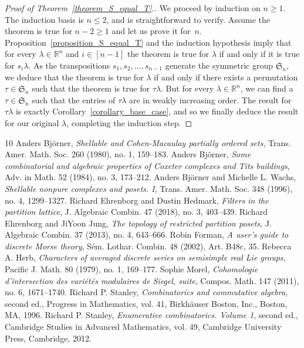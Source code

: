 \documentclass[10pt]{amsart}
\theoremstyle{definition}
\newcommand{\Rrr}{\mathbb{R}}
\newcommand{\Sym}{\mathfrak{S}}
\begin{document}
\begin{proof}[Proof of Theorem~\ref{theorem_S_equal_T}.]
We proceed by induction on $n \geq 1$.
The induction basis is $n \leq 2$, and is straightforward to verify.
Assume the theorem is true for $n-2 \geq 1$ and let us prove it for~$n$.
Proposition~\ref{proposition_S_equal_T} and the induction hypothesis imply that for
every $\lambda \in \Rrr^{n}$ and $i \in [n-1]$ 
the theorem is true for $\lambda$
if and only if it is true for $s_{i}\lambda$.
As the transpositions $s_{1}, s_{2}, \ldots, s_{n-1}$
generate the symmetric group $\Sym_{n}$, we deduce 
that the theorem is true for
$\lambda$ if and only if there exists 
a permutation $\tau\in\Sym_{n}$ such that the theorem is
true for $\tau\lambda$.
But for every $\lambda \in \Rrr^{n}$, we can find a $\tau \in \Sym_{n}$
such that the entries of $\tau\lambda$ are in weakly increasing order. 
The
result for $\tau\lambda$ is exactly Corollary~\ref{corollary_base_case}, and so we
finally deduce the result for our original $\lambda$,
completing the induction step.
\end{proof}
\begin{thebibliography}{10}
 Anders Bj\"orner, \emph{Shellable and Cohen-Macaulay partially ordered sets}, Trans. Amer. Math. Soc. 260 (1980), no. 1, 159--183.
 Anders Bj\"orner, \emph{Some combinatorial and algebraic properties of Coxeter complexes and Tits buildings}, Adv. in Math. 52 (1984), no. 3, 173--212.
 Anders Bj\"orner and Michelle L. Wachs, \emph{Shellable nonpure complexes and posets. I}, Trans. Amer. Math. Soc. 348 (1996), no. 4, 1299--1327.
 Richard Ehrenborg and Dustin Hedmark, \emph{Filters in the partition lattice}, J. Algebraic Combin. 47 (2018), no. 3, 403--439.
 Richard Ehrenborg and JiYoon Jung, \emph{The topology of restricted partition posets}, J. Algebraic Combin. 37 (2013), no. 4, 643--666.
 Robin Forman, \emph{A user's guide to discrete Morse theory}, S\'em. Lothar. Combin. 48 (2002), Art. B48c, 35.
 Rebecca A. Herb, \emph{Characters of averaged discrete series on semisimple real Lie groups}, Pacific J. Math. 80 (1979), no. 1, 169--177.
 Sophie Morel, \emph{Cohomologie d'intersection des vari\'et\'es modulaires de Siegel, suite}, Compos. Math. 147 (2011), no. 6, 1671--1740.
 Richard P. Stanley, \emph{Combinatorics and commutative algebra}, second ed., Progress in Mathematics, vol. 41, Birkh\"auser Boston, Inc., Boston, MA, 1996.
 Richard P. Stanley, \emph{Enumerative combinatorics. Volume 1}, second ed., Cambridge Studies in Advanced Mathematics, vol. 49, Cambridge University Press, Cambridge, 2012.
\end{thebibliography}
\end{document}
